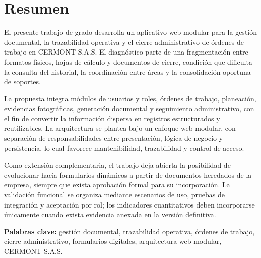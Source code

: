 
\chapter*{Resumen}

El presente trabajo de grado desarrolla un aplicativo web modular para la gestión documental, la trazabilidad operativa y el cierre administrativo de órdenes de trabajo en CERMONT S.A.S. El diagnóstico parte de una fragmentación entre formatos físicos, hojas de cálculo y documentos de cierre, condición que dificulta la consulta del historial, la coordinación entre áreas y la consolidación oportuna de soportes.

La propuesta integra módulos de usuarios y roles, órdenes de trabajo, planeación, evidencias fotográficas, generación documental y seguimiento administrativo, con el fin de convertir la información dispersa en registros estructurados y reutilizables. La arquitectura se plantea bajo un enfoque web modular, con separación de responsabilidades entre presentación, lógica de negocio y persistencia, lo cual favorece mantenibilidad, trazabilidad y control de acceso.

Como extensión complementaria, el trabajo deja abierta la posibilidad de evolucionar hacia formularios dinámicos a partir de documentos heredados de la empresa, siempre que exista aprobación formal para su incorporación. La validación funcional se organiza mediante escenarios de uso, pruebas de integración y aceptación por rol; los indicadores cuantitativos deben incorporarse únicamente cuando exista evidencia anexada en la versión definitiva.

\vspace{0.5cm}
\noindent\textbf{Palabras clave:} gestión documental, trazabilidad operativa, órdenes de trabajo, cierre administrativo, formularios digitales, arquitectura web modular, CERMONT S.A.S.
